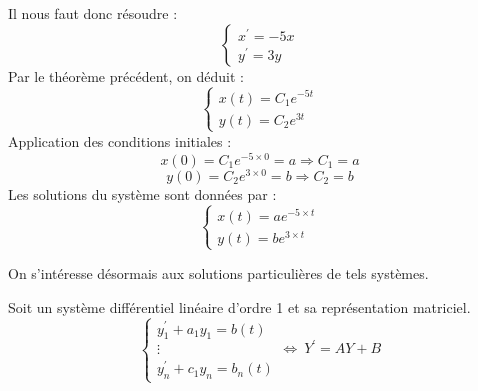 \begin{ex}
Il nous faut donc résoudre :
$$\begin{cases}
x^{\prime}=-5x\\
y^{\prime}=3y
\end{cases}$$
Par le théorème précédent, on déduit :
$$\begin{cases}
x(t)=C_1 e^{-5t}\\
y(t)=C_2 e^{3t}
\end{cases}$$
Application des conditions initiales :
$$x(0)=C_1 e^{-5\times0}=a \Rightarrow C_1=a$$
$$y(0)=C_2 e^{3\times 0}=b \Rightarrow C_2=b$$
Les solutions du système sont données par :
$$\begin{cases}
x(t)=ae^{-5\times t}\\
y(t)=be^{3\times t}
\end{cases}$$
\end{ex}
On s'intéresse désormais aux solutions particulières de tels systèmes.
\begin{thm}[Théorème]
Soit un système différentiel linéaire d'ordre 1 et sa représentation matriciel.
$$
\begin{cases}
y_1^{\prime}+a_1 y_1 = b(t)\\
\vdots\\
y_{n}^{\prime}+c_1 y_n = b_n(t)
\end{cases}\Leftrightarrow\ Y^{\prime}=AY+B$$
\end{thm}
\begin{demo}

\end{demo}
